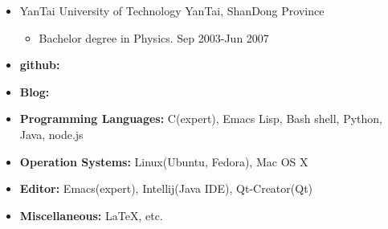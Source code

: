 \documentclass[a4paper, 10pt, titlepage]{article}
\begin{document}
\begin{itemize}

\item YanTai University of Technology \hfill \textrm{YanTai, ShanDong Province}
  \begin{itemize}
  \item Bachelor degree in Physics.  \hfill \textrm{Sep 2003-Jun 2007}
  \end{itemize}

\end{itemize}

\begin{itemize}
\item \textbf{github:}{\small \href{https://github.com/suzp1984}{\color{blue}{https://github.com/suzp1984}}}
\item \textbf{Blog:}{\small \href{http://zpcat.blogspot.com/}{\color{blue}{http://zpcat.blogspot.com/}}}
\item \textbf{Programming Languages:} C(expert), Emacs Lisp, Bash shell, Python, Java, node.js
\item \textbf{Operation Systems:} Linux(Ubuntu, Fedora), Mac OS X
\item \textbf{Editor:} Emacs(expert), Intellij(Java IDE), Qt-Creator(Qt)
\item \textbf{Miscellaneous:} {\LaTeX}, etc.
\end{itemize}
\end{document}
